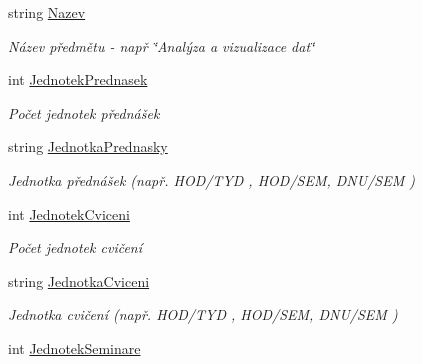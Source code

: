 \begin{DoxyCompactItemize}
string \hyperlink{class_analyza_rozvrhu_1_1_s_t_a_g___classes_1_1_predmet_aabf6ab79f35a27c79eec83cb4d840386}{Nazev}
\begin{DoxyCompactList}\small\item\em Název předmětu -\/ např \char`\"{}\+Analýza a vizualizace dat\char`\"{} \end{DoxyCompactList}\item 
int \hyperlink{class_analyza_rozvrhu_1_1_s_t_a_g___classes_1_1_predmet_a634af334b1eb84f07848f31561680590}{Jednotek\+Prednasek}
\begin{DoxyCompactList}\small\item\em Počet jednotek přednášek \end{DoxyCompactList}\item 
string \hyperlink{class_analyza_rozvrhu_1_1_s_t_a_g___classes_1_1_predmet_ae6649e65b827f7b894ddebdb79982a03}{Jednotka\+Prednasky}
\begin{DoxyCompactList}\small\item\em Jednotka přednášek (např. H\+O\+D/\+T\+YD , H\+O\+D/\+S\+EM, D\+N\+U/\+S\+EM ) \end{DoxyCompactList}\item 
int \hyperlink{class_analyza_rozvrhu_1_1_s_t_a_g___classes_1_1_predmet_aa4877e97f414f4ec7748d932c7aa3b19}{Jednotek\+Cviceni}
\begin{DoxyCompactList}\small\item\em Počet jednotek cvičení \end{DoxyCompactList}\item 
string \hyperlink{class_analyza_rozvrhu_1_1_s_t_a_g___classes_1_1_predmet_a51d09bf0600c281774dc06cb6129544c}{Jednotka\+Cviceni}
\begin{DoxyCompactList}\small\item\em Jednotka cvičení (např. H\+O\+D/\+T\+YD , H\+O\+D/\+S\+EM, D\+N\+U/\+S\+EM ) \end{DoxyCompactList}\item 
int \hyperlink{class_analyza_rozvrhu_1_1_s_t_a_g___classes_1_1_predmet_ae2f9cb19c19527de5be9837e6887b0fc}{Jednotek\+Seminare}

\end{DoxyCompactItemize}

